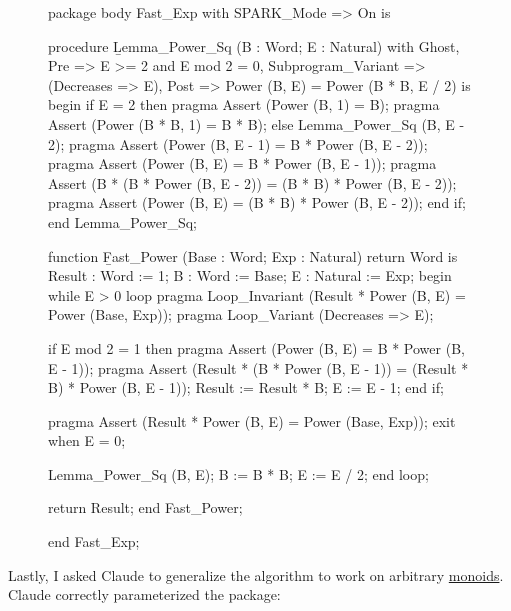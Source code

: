 \documentclass{article}
\begin{document}
\begin{figure}
\begin{code}[linenumbers]
package body Fast\_Exp
  with SPARK\_Mode => On
is

   procedure \b{Lemma\_Power\_Sq} (B : Word; E : Natural)
     with Ghost, Pre => E >= 2 and E mod 2 = 0,
          Subprogram\_Variant => (Decreases => E),
          Post => Power (B, E) = Power (B * B, E / 2)
   is
   begin
      if E = 2 then
         pragma Assert (Power (B, 1) = B);
         pragma Assert (Power (B * B, 1) = B * B);
      else
         Lemma\_Power\_Sq (B, E - 2);
         pragma Assert (Power (B, E - 1) = B * Power (B, E - 2));
         pragma Assert (Power (B, E) = B * Power (B, E - 1));
         pragma Assert (B * (B * Power (B, E - 2)) =
                       (B * B) * Power (B, E - 2));
         pragma Assert (Power (B, E) = (B * B) * Power (B, E - 2));
      end if;
   end Lemma\_Power\_Sq;

   function \b{Fast\_Power} (Base : Word; Exp : Natural) return Word is
      Result : Word := 1;
      B      : Word := Base;
      E      : Natural := Exp;
   begin
      while E > 0 loop
         pragma Loop\_Invariant (Result * Power (B, E) =
                                Power (Base, Exp));
         pragma Loop\_Variant (Decreases => E);

         if E mod 2 = 1 then
            pragma Assert (Power (B, E) = B * Power (B, E - 1));
            pragma Assert (Result * (B * Power (B, E - 1)) =
                          (Result * B) * Power (B, E - 1));
            Result := Result * B;
            E := E - 1;
         end if;

         pragma Assert (Result * Power (B, E) = Power (Base, Exp));
         exit when E = 0;

         Lemma\_Power\_Sq (B, E);
         B := B * B;
         E := E / 2;
      end loop;

      return Result;
   end Fast\_Power;

 end Fast\_Exp;
\end{code}
\end{figure}

Lastly, I asked Claude to generalize the algorithm to work on arbitrary \href{https://en.wikipedia.org/wiki/Monoid}{monoids}.
Claude correctly parameterized the package:
\end{document}
